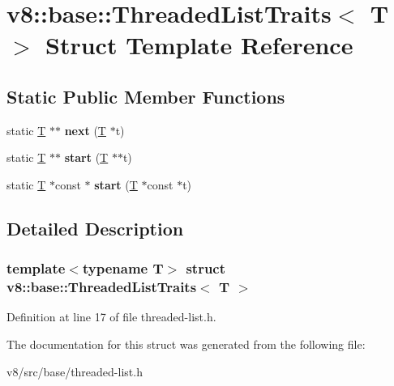 \hypertarget{structv8_1_1base_1_1ThreadedListTraits}{}\section{v8\+:\+:base\+:\+:Threaded\+List\+Traits$<$ T $>$ Struct Template Reference}
\label{structv8_1_1base_1_1ThreadedListTraits}
\subsection*{Static Public Member Functions}
\begin{DoxyCompactItemize}
\item 
\mbox{\label{structv8_1_1base_1_1ThreadedListTraits_a69e2c290a69d7bc4a60511b7b4e1b0db}} 
static \mbox{\hyperlink{classv8_1_1internal_1_1torque_1_1T}{T}} $\ast$$\ast$ {\bfseries next} (\mbox{\hyperlink{classv8_1_1internal_1_1torque_1_1T}{T}} $\ast$t)
\item 
\mbox{\label{structv8_1_1base_1_1ThreadedListTraits_aa835684e6673091d33069e4ea8f8f145}} 
static \mbox{\hyperlink{classv8_1_1internal_1_1torque_1_1T}{T}} $\ast$$\ast$ {\bfseries start} (\mbox{\hyperlink{classv8_1_1internal_1_1torque_1_1T}{T}} $\ast$$\ast$t)
\item 
\mbox{\label{structv8_1_1base_1_1ThreadedListTraits_ab780c91a74675630f6b26cd63a5ff180}} 
static \mbox{\hyperlink{classv8_1_1internal_1_1torque_1_1T}{T}} $\ast$const  $\ast$ {\bfseries start} (\mbox{\hyperlink{classv8_1_1internal_1_1torque_1_1T}{T}} $\ast$const $\ast$t)
\end{DoxyCompactItemize}


\subsection{Detailed Description}
\subsubsection*{template$<$typename T$>$\newline
struct v8\+::base\+::\+Threaded\+List\+Traits$<$ T $>$}



Definition at line 17 of file threaded-\/list.\+h.



The documentation for this struct was generated from the following file\+:\begin{DoxyCompactItemize}
\item 
v8/src/base/threaded-\/list.\+h\end{DoxyCompactItemize}

